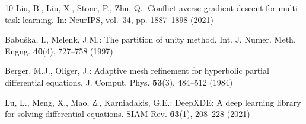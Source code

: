 \documentclass[runningheads]{llncs}
\begin{document}
\begin{thebibliography}{10}
Liu, B., Liu, X., Stone, P., Zhu, Q.: Conflict-averse gradient descent for multi-task learning. In: NeurIPS, vol.~34, pp. 1887--1898 (2021)

Babu\v{s}ka, I., Melenk, J.M.: The partition of unity method. Int. J. Numer. Meth. Engng. \textbf{40}(4), 727--758 (1997)

Berger, M.J., Oliger, J.: Adaptive mesh refinement for hyperbolic partial differential equations. J. Comput. Phys. \textbf{53}(3), 484--512 (1984)

Lu, L., Meng, X., Mao, Z., Karniadakis, G.E.: DeepXDE: A deep learning library for solving differential equations. SIAM Rev. \textbf{63}(1), 208--228 (2021)

\end{thebibliography}
\end{document}
